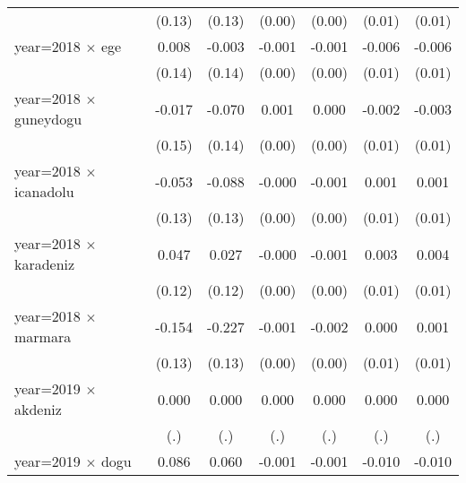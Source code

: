 {\begin{tabular}{l*{6}{c}}
                    &      (0.13)         &      (0.13)         &      (0.00)         &      (0.00)         &      (0.01)         &      (0.01)         \\
year=2018 $\times$ ege&       0.008         &      -0.003         &      -0.001         &      -0.001         &      -0.006         &      -0.006         \\
                    &      (0.14)         &      (0.14)         &      (0.00)         &      (0.00)         &      (0.01)         &      (0.01)         \\
year=2018 $\times$ guneydogu&      -0.017         &      -0.070         &       0.001         &       0.000         &      -0.002         &      -0.003         \\
                    &      (0.15)         &      (0.14)         &      (0.00)         &      (0.00)         &      (0.01)         &      (0.01)         \\
year=2018 $\times$ icanadolu&      -0.053         &      -0.088         &      -0.000         &      -0.001         &       0.001         &       0.001         \\
                    &      (0.13)         &      (0.13)         &      (0.00)         &      (0.00)         &      (0.01)         &      (0.01)         \\
year=2018 $\times$ karadeniz&       0.047         &       0.027         &      -0.000         &      -0.001         &       0.003         &       0.004         \\
                    &      (0.12)         &      (0.12)         &      (0.00)         &      (0.00)         &      (0.01)         &      (0.01)         \\
year=2018 $\times$ marmara&      -0.154         &      -0.227         &      -0.001         &      -0.002         &       0.000         &       0.001         \\
                    &      (0.13)         &      (0.13)         &      (0.00)         &      (0.00)         &      (0.01)         &      (0.01)         \\
year=2019 $\times$ akdeniz&       0.000         &       0.000         &       0.000         &       0.000         &       0.000         &       0.000         \\
                    &         (.)         &         (.)         &         (.)         &         (.)         &         (.)         &         (.)         \\
year=2019 $\times$ dogu&       0.086         &       0.060         &      -0.001         &      -0.001         &      -0.010         &      -0.010         \\

\end{tabular}}
